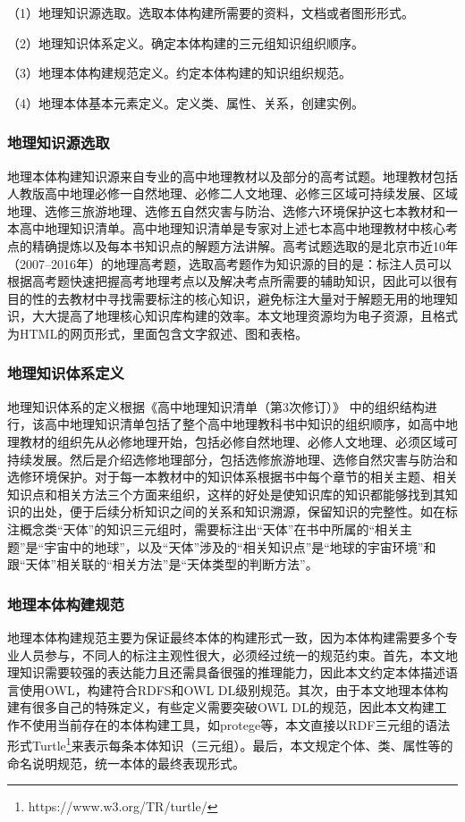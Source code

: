 （1）地理知识源选取。选取本体构建所需要的资料，文档或者图形形式。

（2）地理知识体系定义。确定本体构建的三元组知识组织顺序。

（3）地理本体构建规范定义。约定本体构建的知识组织规范。

（4）地理本体基本元素定义。定义类、属性、关系，创建实例。

\subsubsection{地理知识源选取}
地理本体构建知识源来自专业的高中地理教材以及部分的高考试题。地理教材包括人教版高中地理必修一自然地理、必修二人文地理、必修三区域可持续发展、区域地理、选修三旅游地理、选修五自然灾害与防治、选修六环境保护这七本教材和一本高中地理知识清单。高中地理知识清单是专家对上述七本高中地理教材中核心考点的精确提炼以及每本书知识点的解题方法讲解。高考试题选取的是北京市近10年（2007--2016年）的地理高考题，选取高考题作为知识源的目的是：标注人员可以根据高考题快速把握高考地理考点以及解决考点所需要的辅助知识，因此可以很有目的性的去教材中寻找需要标注的核心知识，避免标注大量对于解题无用的地理知识，大大提高了地理核心知识库构建的效率。本文地理资源均为电子资源，且格式为HTML的网页形式，里面包含文字叙述、图和表格。

\subsubsection{地理知识体系定义}
地理知识体系的定义根据《高中地理知识清单（第3次修订）》
中的组织结构进行，该高中地理知识清单包括了整个高中地理教科书中知识的组织顺序，如高中地理教材的组织先从必修地理开始，包括必修自然地理、必修人文地理、必须区域可持续发展。然后是介绍选修地理部分，包括选修旅游地理、选修自然灾害与防治和选修环境保护。对于每一本教材中的知识体系根据书中每个章节的相关主题、相关知识点和相关方法三个方面来组织，这样的好处是使知识库的知识都能够找到其知识的出处，便于后续分析知识之间的关系和知识溯源，保留知识的完整性。如在标注概念类“天体”的知识三元组时，需要标注出“天体”在书中所属的“相关主题”是“宇宙中的地球”，以及“天体”涉及的“相关知识点”是“地球的宇宙环境”和跟“天体”相关联的“相关方法”是“天体类型的判断方法”。

\subsubsection{地理本体构建规范}
地理本体构建规范主要为保证最终本体的构建形式一致，因为本体构建需要多个专业人员参与，不同人的标注主观性很大，必须经过统一的规范约束。首先，本文地理知识需要较强的表达能力且还需具备很强的推理能力，因此本文约定本体描述语言使用OWL，构建符合RDFS和OWL DL级别规范。其次，由于本文地理本体构建有很多自己的特殊定义，有些定义需要突破OWL DL的规范，因此本文构建工作不使用当前存在的本体构建工具，如protege等，本文直接以RDF三元组的语法形式Turtle\footnote{https://www.w3.org/TR/turtle/}来表示每条本体知识（三元组）。最后，本文规定个体、类、属性等的命名说明规范，统一本体的最终表现形式。


